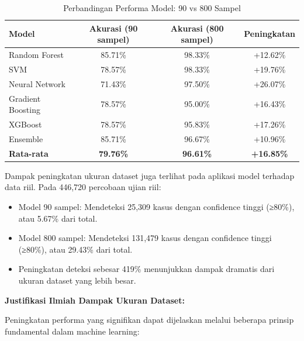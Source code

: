 \begin{table}[htbp]
\centering
\caption{Perbandingan Performa Model: 90 vs 800 Sampel}
\label{tabel:perbandingan90vs800}
\begin{tabular}{|l|c|c|c|}
\hline
\textbf{Model} & \textbf{Akurasi (90 sampel)} & \textbf{Akurasi (800 sampel)} & \textbf{Peningkatan} \\
\hline
Random Forest & 85.71\% & 98.33\% & +12.62\% \\
\hline
SVM & 78.57\% & 98.33\% & +19.76\% \\
\hline
Neural Network & 71.43\% & 97.50\% & +26.07\% \\
\hline
Gradient Boosting & 78.57\% & 95.00\% & +16.43\% \\
\hline
XGBoost & 78.57\% & 95.83\% & +17.26\% \\
\hline
Ensemble & 85.71\% & 96.67\% & +10.96\% \\
\hline
\textbf{Rata-rata} & \textbf{79.76\%} & \textbf{96.61\%} & \textbf{+16.85\%} \\
\hline
\end{tabular}
\end{table}

Dampak peningkatan ukuran dataset juga terlihat pada aplikasi model terhadap data riil. Pada 446,720 percobaan ujian riil:
\begin{itemize}
    \item Model 90 sampel: Mendeteksi 25,309 kasus dengan confidence tinggi (≥80\%), atau 5.67\% dari total.
    \item Model 800 sampel: Mendeteksi 131,479 kasus dengan confidence tinggi (≥80\%), atau 29.43\% dari total.
    \item Peningkatan deteksi sebesar 419\% menunjukkan dampak dramatis dari ukuran dataset yang lebih besar.
\end{itemize}

\textbf{Justifikasi Ilmiah Dampak Ukuran Dataset:}

Peningkatan performa yang signifikan dapat dijelaskan melalui beberapa prinsip fundamental dalam machine learning:

